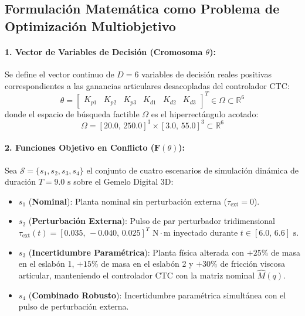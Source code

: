 \documentclass[11pt,a4paper]{article}
\begin{document}
\subsection{Formulación Matemática como Problema de Optimización Multiobjetivo}

\paragraph{1. Vector de Variables de Decisión (Cromosoma $\theta$):}
Se define el vector continuo de $D = 6$ variables de decisión reales positivas correspondientes a las ganancias articulares desacopladas del controlador CTC:
\begin{equation}
    \theta = \begin{bmatrix} K_{p1} & K_{p2} & K_{p3} & K_{d1} & K_{d2} & K_{d3} \end{bmatrix}^T \in \Omega \subset \mathbb{R}^6
\end{equation}
donde el espacio de búsqueda factible $\Omega$ es el hiperrectángulo acotado:
\begin{equation}
    \Omega = [20.0,\, 250.0]^3 \times [3.0,\, 55.0]^3 \subset \mathbb{R}^6
\end{equation}

\paragraph{2. Funciones Objetivo en Conflicto ($\mathbf{F}(\theta)$):}
Sea $\mathcal{S} = \{s_1, s_2, s_3, s_4\}$ el conjunto de cuatro escenarios de simulación dinámica de duración $T = 9.0\text{ s}$ sobre el Gemelo Digital 3D:
\begin{itemize}
    \item $s_1$ (\textbf{Nominal}): Planta nominal sin perturbación externa ($\tau_{\text{ext}} = 0$).
    \item $s_2$ (\textbf{Perturbación Externa}): Pulso de par perturbador tridimensional $\tau_{\text{ext}}(t) = [0.035,\, -0.040,\, 0.025]^T\text{ N}\cdot\text{m}$ inyectado durante $t \in [6.0,\, 6.6]\text{ s}$.
    \item $s_3$ (\textbf{Incertidumbre Paramétrica}): Planta física alterada con $+25\%$ de masa en el eslabón 1, $+15\%$ de masa en el eslabón 2 y $+30\%$ de fricción viscosa articular, manteniendo el controlador CTC con la matriz nominal $\hat{M}(q)$.
    \item $s_4$ (\textbf{Combinado Robusto}): Incertidumbre paramétrica simultánea con el pulso de perturbación externa.
\end{itemize}
\end{document}
